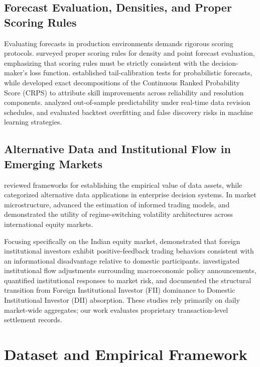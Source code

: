 \documentclass{ieeeaccess}
\begin{document}
\subsection{Forecast Evaluation, Densities, and Proper Scoring Rules}
Evaluating forecasts in production environments demands rigorous scoring protocols. \cite{waghmare2026proper} surveyed proper scoring rules for density and point forecast evaluation, emphasizing that scoring rules must be strictly consistent with the decision-maker's loss function. \cite{allen2025tail} established tail-calibration tests for probabilistic forecasts, while \cite{arnold2024decompositions} developed exact decompositions of the Continuous Ranked Probability Score (CRPS) to attribute skill improvements across reliability and resolution components. \cite{goncalves2025bootstrapping} analyzed out-of-sample predictability under real-time data revision schedules, and \cite{arian2024backtest} evaluated backtest overfitting and false discovery risks in machine learning strategies.

\subsection{Alternative Data and Institutional Flow in Emerging Markets}
\cite{coyle2024is} reviewed frameworks for establishing the empirical value of data assets, while \cite{sun2024alternative} categorized alternative data applications in enterprise decision systems. In market microstructure, \cite{ghachem2025estimation} advanced the estimation of informed trading models, and \cite{ding2025forecasting} demonstrated the utility of regime-switching volatility architectures across international equity markets.

Focusing specifically on the Indian equity market, \cite{raizada2025trade} demonstrated that foreign institutional investors exhibit positive-feedback trading behaviors consistent with an informational disadvantage relative to domestic participants. \cite{thapa2026policy} investigated institutional flow adjustments surrounding macroeconomic policy announcements, \cite{dey2024study} quantified institutional responses to market risk, and \cite{maheshwari2026fii} documented the structural transition from Foreign Institutional Investor (FII) dominance to Domestic Institutional Investor (DII) absorption. These studies rely primarily on daily market-wide aggregates; our work evaluates proprietary transaction-level settlement records.

\section{Dataset and Empirical Framework}
\label{sec:data}
\end{document}
